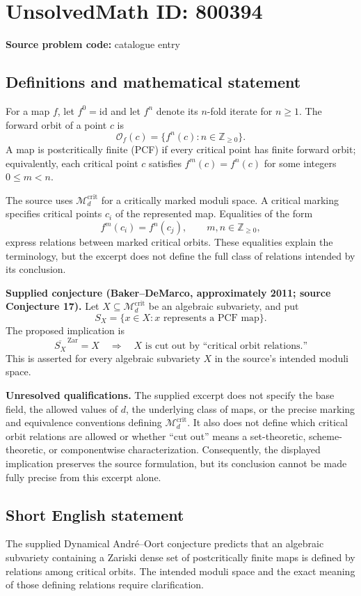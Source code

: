 \documentclass[11pt]{article}
\newcommand{\Z}{\mathbb{Z}}
\begin{document}
\section*{UnsolvedMath ID: 800394}
\textbf{Source problem code:} catalogue entry
\subsection{Definitions and mathematical statement}
For a map \(f\), let \(f^0=\mathrm{id}\) and let \(f^n\) denote its \(n\)-fold iterate for \(n\geq 1\). The forward orbit of a point \(c\) is
\[
\mathcal O_f(c)=\{f^n(c):n\in\Z_{\geq 0}\}.
\]
A map is postcritically finite (PCF) if every critical point has finite forward orbit; equivalently, each critical point \(c\) satisfies \(f^m(c)=f^n(c)\) for some integers \(0\leq m<n\).

The source uses \(\mathcal M_d^{\mathrm{crit}}\) for a critically marked moduli space. A critical marking specifies critical points \(c_i\) of the represented map. Equalities of the form
\[
f^m(c_i)=f^n(c_j),\qquad m,n\in\Z_{\geq 0},
\]
express relations between marked critical orbits. These equalities explain the terminology, but the excerpt does not define the full class of relations intended by its conclusion.

\textbf{Supplied conjecture (Baker--DeMarco, approximately 2011; source Conjecture 17).}
Let \(X\subseteq\mathcal M_d^{\mathrm{crit}}\) be an algebraic subvariety, and put
\[
S_X=\{x\in X: x\text{ represents a PCF map}\}.
\]
The proposed implication is
\[
\overline{S_X}^{\,\mathrm{Zar}}=X
\quad\Longrightarrow\quad
X\text{ is cut out by ``critical orbit relations.''}
\]
This is asserted for every algebraic subvariety \(X\) in the source's intended moduli space.

\textbf{Unresolved qualifications.} The supplied excerpt does not specify the base field, the allowed values of \(d\), the underlying class of maps, or the precise marking and equivalence conventions defining \(\mathcal M_d^{\mathrm{crit}}\). It also does not define which critical orbit relations are allowed or whether ``cut out'' means a set-theoretic, scheme-theoretic, or componentwise characterization. Consequently, the displayed implication preserves the source formulation, but its conclusion cannot be made fully precise from this excerpt alone.
\subsection{Short English statement}
The supplied Dynamical Andr{\'e}--Oort conjecture predicts that an algebraic subvariety containing a Zariski dense set of postcritically finite maps is defined by relations among critical orbits. The intended moduli space and the exact meaning of those defining relations require clarification.
\end{document}
